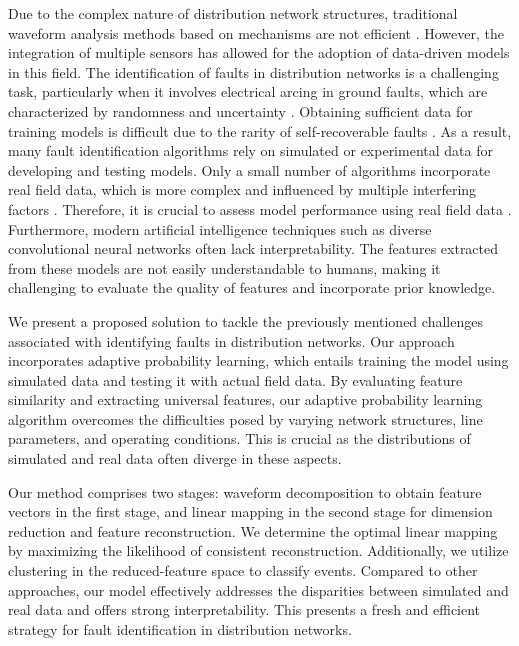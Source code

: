 \documentclass[conference]{IEEEtran}
\begin{document}
Due to the complex nature of distribution network structures, traditional waveform analysis methods based on mechanisms are not efficient \cite{zheng2021rsspn}. However, the integration of multiple sensors has allowed for the adoption of data-driven models in this field. The identification of faults in distribution networks is a challenging task, particularly when it involves electrical arcing in ground faults, which are characterized by randomness and uncertainty \cite{liu2022high}. Obtaining sufficient data for training models is difficult due to the rarity of self-recoverable faults \cite{tao2020parallel}. As a result, many fault identification algorithms rely on simulated or experimental data for developing and testing models. Only a small number of algorithms incorporate real field data, which is more complex and influenced by multiple interfering factors \cite{ju2020study} \cite{xu2020detection}. Therefore, it is crucial to assess model performance using real field data \cite{zhang2019fault}\cite{liang2020novel}. Furthermore, modern artificial intelligence techniques such as diverse convolutional neural networks often lack interpretability. The features extracted from these models are not easily understandable to humans, making it challenging to evaluate the quality of features and incorporate prior knowledge.

We present a proposed solution to tackle the previously mentioned challenges associated with identifying faults in distribution networks. Our approach incorporates adaptive probability learning, which entails training the model using simulated data and testing it with actual field data. By evaluating feature similarity and extracting universal features, our adaptive probability learning algorithm overcomes the difficulties posed by varying network structures, line parameters, and operating conditions. This is crucial as the distributions of simulated and real data often diverge in these aspects.



Our method comprises two stages: waveform decomposition to obtain feature vectors in the first stage, and linear mapping in the second stage for dimension reduction and feature reconstruction. We determine the optimal linear mapping by maximizing the likelihood of consistent reconstruction. Additionally, we utilize clustering in the reduced-feature space to classify events. Compared to other approaches, our model effectively addresses the disparities between simulated and real data and offers strong interpretability. This presents a fresh and efficient strategy for fault identification in distribution networks.
\end{document}
